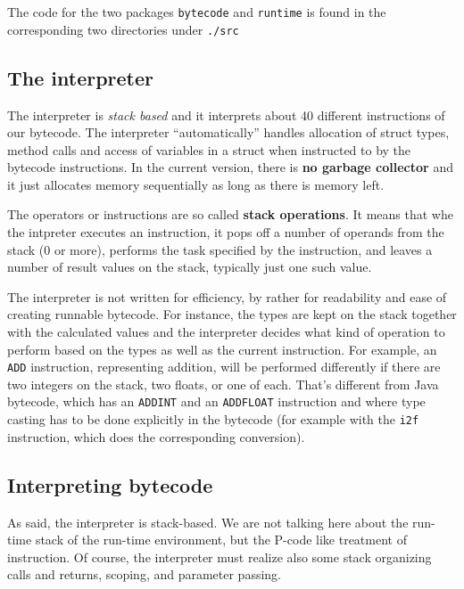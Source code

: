 \documentclass[11pt]{article}
\begin{document}
The code for the two packages \texttt{bytecode} and \texttt{runtime} is found in the
corresponding two directories under \texttt{./src}

\subsection{The interpreter}
\label{sec:org686784d}

The interpreter is \emph{stack based} and it interprets about 40 different
instructions of our bytecode.  The interpreter ``automatically'' handles
allocation of struct types, method calls and access of variables in a
struct when instructed to by the bytecode instructions. In the current
version, there is \textbf{no garbage collector} and it just allocates memory
sequentially as long as there is memory left.


The operators or instructions are so called \textbf{stack operations}. It means
that whe the intpreter executes an instruction, it pops off a number of
operands from the stack (0 or more), performs the task specified by the
instruction, and leaves a number of result values on the stack, typically
just one such value.

The interpreter is not written for efficiency, by rather for readability
and ease of creating runnable bytecode. For instance, the types are kept on
the stack together with the calculated values and the interpreter decides
what kind of operation to perform based on the types as well as the current
instruction. For example, an \texttt{ADD} instruction, representing addition, will
be performed differently if there are two integers on the stack, two
floats, or one of each. That's different from Java bytecode, which has an
\texttt{ADDINT} and an \texttt{ADDFLOAT} instruction and where type casting has to be
done explicitly in the bytecode (for example with the \texttt{i2f} instruction,
which does the corresponding conversion).

\subsection{Interpreting bytecode}
\label{sec:orgb89cde5}


As said, the interpreter is stack-based. We are not talking here about the
run-time stack of the run-time environment, but the P-code like treatment
of instruction. Of course, the interpreter must realize also some stack
organizing calls and returns, scoping, and parameter passing.
\end{document}
